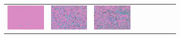 \documentclass{ipol}
\begin{document}
\begin{figure}[ht]
\begin{subfigure}[t]{\linewidth}
\begin{tabular}{ccccccccc}
                \includegraphics[width=\s]{images/tower/LINEAR/bid_n5_64_grids.png}&
                \includegraphics[width=\s]{images/tower/PPG/bid_n5_64_grids.png}&
                \includegraphics[width=\s]{images/tower/VNG/bid_n5_64_grids.png}\\

\end{tabular}
\end{subfigure}
\end{figure}
\end{document}
